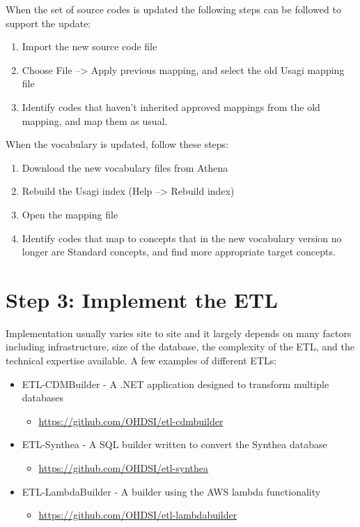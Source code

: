 \documentclass[11pt]{book}
\providecommand{\tightlist}{%
  \setlength{\itemsep}{0pt}\setlength{\parskip}{0pt}}
\theoremstyle{definition}
\theoremstyle{definition}
\theoremstyle{definition}
\theoremstyle{remark}
\begin{document}
When the set of source codes is updated the following steps can be followed to support the update:

\begin{enumerate}
\def\labelenumi{\arabic{enumi}.}
\tightlist
\item
  Import the new source code file
\item
  Choose File --\textgreater{} Apply previous mapping, and select the old Usagi mapping file
\item
  Identify codes that haven't inherited approved mappings from the old mapping, and map them as usual.
\end{enumerate}

When the vocabulary is updated, follow these steps:

\begin{enumerate}
\def\labelenumi{\arabic{enumi}.}
\tightlist
\item
  Download the new vocabulary files from Athena
\item
  Rebuild the Usagi index (Help --\textgreater{} Rebuild index)
\item
  Open the mapping file
\item
  Identify codes that map to concepts that in the new vocabulary version no longer are Standard concepts, and find more appropriate target concepts.
\end{enumerate}

\hypertarget{step-3-implement-the-etl}{%
\section{Step 3: Implement the ETL}\label{step-3-implement-the-etl}}

Implementation usually varies site to site and it largely depends on many factors including infrastructure, size of the database, the complexity of the ETL, and the technical expertise available. A few examples of different ETLs: 

\begin{itemize}
\tightlist
\item
  ETL-CDMBuilder - A .NET application designed to transform multiple databases

  \begin{itemize}
  \tightlist
  \item
    \url{https://github.com/OHDSI/etl-cdmbuilder}
  \end{itemize}
\item
  ETL-Synthea - A SQL builder written to convert the Synthea database

  \begin{itemize}
  \tightlist
  \item
    \url{https://github.com/OHDSI/etl-synthea}
  \end{itemize}
\item
  ETL-LambdaBuilder - A builder using the AWS lambda functionality

  \begin{itemize}
  \tightlist
  \item
    \url{https://github.com/OHDSI/etl-lambdabuilder}
  \end{itemize}
\end{itemize}
\end{document}
